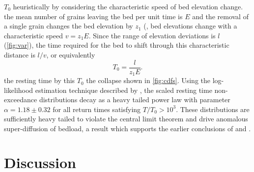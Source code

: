 \DIFdelbegin {}\DIFdelend \DIFaddbegin {}\DIFaddend $T_0$ \DIFaddbegin {}\DIFaddend heuristically by considering the characteristic speed of bed elevation change.
\DIFdelbegin {}\DIFdelend \DIFaddbegin {}\DIFaddend the mean number of grains leaving the bed per unit time is $E$ \DIFdelbegin \DIFdel{, }\DIFdelend and the removal of a single grain changes the bed elevation by $z_1$ (\DIFdelbegin {}\DIFdelend \DIFaddbegin {}\DIFaddend , bed elevations change with a characteristic speed $v = z_1 E$.
Since the range of elevation deviations is $l$ (\DIFdelbegin {}\DIFdelend \DIFaddbegin {}\DIFaddend \ref{fig:var}), the time required for the bed to shift through this characteristic distance is $l/v$, or equivalently
\begin{equation} T_0 = \frac{l}{z_1 E}.\label{eq:time}\end{equation}
\DIFdelbegin {}\DIFdelend \DIFaddbegin {}\DIFaddend the resting time by this $T_0$ \DIFdelbegin {}\DIFdelend \DIFaddbegin {}\DIFaddend the collapse shown in \DIFdelbegin {}\DIFdelend \DIFaddbegin {}\DIFaddend \ref{fig:cdfs}.
Using the log-likelihood estimation technique described by \citet{Newman2005}, \DIFdelbegin {}\DIFdelend the scaled resting time non-exceedance distributions \DIFaddbegin {}\DIFaddend decay as a heavy tailed power law with parameter $\alpha = 1.18 \pm 0.32$ for all return times satisfying $T/T_0 > 10^3$.
These distributions are sufficiently heavy tailed to violate the central limit theorem and drive anomalous super-diffusion of bedload, a result which supports the earlier conclusions of \citet{Voepel2013} and \citet{Martin2014}.

\section{Discussion}
\label{sec:elediscussion}


